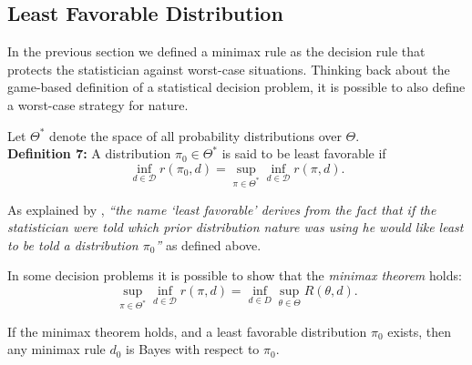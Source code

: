 \documentclass[11pt]{article} %
\begin{document}


\subsection{Least Favorable Distribution}
In the previous section we defined a minimax rule as the decision rule that protects the statistician against worst-case situations. Thinking back about the game-based definition of a statistical decision problem, it is possible to also define a worst-case strategy for nature. 

Let $\Theta^*$ denote the space of all probability distributions over $\Theta$. \\

\noindent \textbf{Definition 7:} A distribution $\pi_0 \in \Theta^*$ is said to be least favorable if
\[ \inf_{d \in \mathcal{D}} r(\pi_0, d) = \sup_{\pi \in \Theta^*} \inf_{d \in \mathcal{D}} r(\pi, d).  \]

As explained by \cite{Ferguson67}, \emph{``the name `least favorable' derives from the fact that if the statistician were told which prior distribution nature was using he would like least to be told a distribution $\pi_0$'' } as defined above.  
 
In some decision problems it is possible to show that the \emph{minimax theorem} holds:
\begin{equation}
\sup_{\pi \in \Theta^*} \inf_{d \in \mathcal{D}} r(\pi, d)  = \inf_{d \in D} \sup_{\theta \in \Theta} R(\theta, d).
\end{equation} 

If the minimax theorem holds, and a least favorable distribution $\pi_0$ exists, then any minimax rule $d_0$ is Bayes with respect to $\pi_0$.


\newpage 



\end{document}
